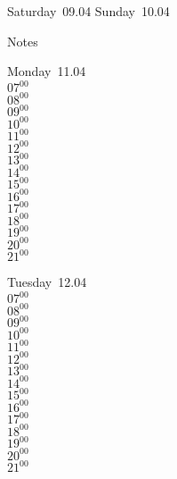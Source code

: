\documentclass[11pt,a4paper]{book}\usepackage[]{graphicx}\usepackage[]{color}
\begin{document}
\begin{weekendbox}
  Saturday~09.04
  \tcblower
  Sunday~10.04
\end{weekendbox} %
\begin{notebox}
  Notes
\end{notebox}
\clearpage
\begin{headerbox}
\end{headerbox}
\begin{weekdaybox}
  Monday~11.04\\
  { 
  \vfill
  $07^{00}$\\
$08^{00}$\\
$09^{00}$\\
$10^{00}$\\
$11^{00}$\\
$12^{00}$\\
$13^{00}$\\
$14^{00}$\\
$15^{00}$\\
$16^{00}$\\
$17^{00}$\\
$18^{00}$\\
$19^{00}$\\
$20^{00}$\\
$21^{00}$\\
  }
\end{weekdaybox}
\begin{weekdaybox}
  Tuesday~12.04\\
  { 
  \vfill
  $07^{00}$\\
$08^{00}$\\
$09^{00}$\\
$10^{00}$\\
$11^{00}$\\
$12^{00}$\\
$13^{00}$\\
$14^{00}$\\
$15^{00}$\\
$16^{00}$\\
$17^{00}$\\
$18^{00}$\\
$19^{00}$\\
$20^{00}$\\
$21^{00}$\\
  }
\end{weekdaybox}
\end{document}
